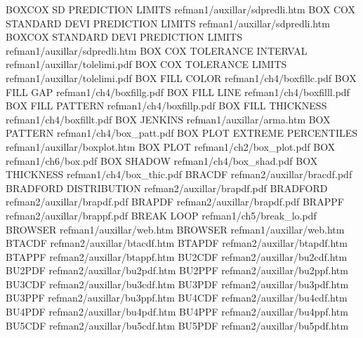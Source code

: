 BOXCOX SD PREDICTION LIMITS             refman1/auxillar/sdpredli.htm
BOX COX STANDARD DEVI PREDICTION LIMITS refman1/auxillar/sdpredli.htm
BOXCOX STANDARD DEVI PREDICTION LIMITS  refman1/auxillar/sdpredli.htm
BOX COX TOLERANCE INTERVAL              refman1/auxillar/tolelimi.pdf
BOX COX TOLERANCE LIMITS                refman1/auxillar/tolelimi.pdf
BOX FILL COLOR                          refman1/ch4/boxfillc.pdf
BOX FILL GAP                            refman1/ch4/boxfillg.pdf
BOX FILL LINE                           refman1/ch4/boxfilll.pdf
BOX FILL PATTERN                        refman1/ch4/boxfillp.pdf
BOX FILL THICKNESS                      refman1/ch4/boxfillt.pdf
BOX JENKINS                             refman1/auxillar/arma.htm
BOX PATTERN                             refman1/ch4/box_patt.pdf
BOX PLOT EXTREME PERCENTILES            refman1/auxillar/boxplot.htm
BOX PLOT                                refman1/ch2/box_plot.pdf
BOX                                     refman1/ch6/box.pdf
BOX SHADOW                              refman1/ch4/box_shad.pdf
BOX THICKNESS                           refman1/ch4/box_thic.pdf
BRACDF                                  refman2/auxillar/bracdf.pdf
BRADFORD DISTRIBUTION                   refman2/auxillar/brapdf.pdf
BRADFORD                                refman2/auxillar/brapdf.pdf
BRAPDF                                  refman2/auxillar/brapdf.pdf
BRAPPF                                  refman2/auxillar/brappf.pdf
BREAK LOOP                              refman1/ch5/break_lo.pdf
BROWSER                                 refman1/auxillar/web.htm
BROWSER                                 refman1/auxillar/web.htm
BTACDF                                  refman2/auxillar/btacdf.htm
BTAPDF                                  refman2/auxillar/btapdf.htm
BTAPPF                                  refman2/auxillar/btappf.htm
BU2CDF                                  refman2/auxillar/bu2cdf.htm
BU2PDF                                  refman2/auxillar/bu2pdf.htm
BU2PPF                                  refman2/auxillar/bu2ppf.htm
BU3CDF                                  refman2/auxillar/bu3cdf.htm
BU3PDF                                  refman2/auxillar/bu3pdf.htm
BU3PPF                                  refman2/auxillar/bu3ppf.htm
BU4CDF                                  refman2/auxillar/bu4cdf.htm
BU4PDF                                  refman2/auxillar/bu4pdf.htm
BU4PPF                                  refman2/auxillar/bu4ppf.htm
BU5CDF                                  refman2/auxillar/bu5cdf.htm
BU5PDF                                  refman2/auxillar/bu5pdf.htm
